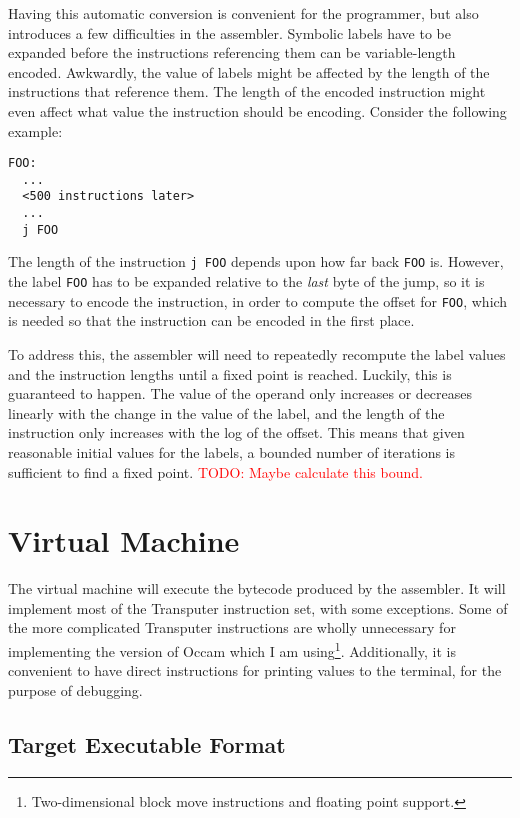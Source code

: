 Having this automatic conversion is convenient for the programmer, but also
introduces a few difficulties in the assembler. Symbolic labels have to be
expanded before the instructions referencing them can be variable-length
encoded. Awkwardly, the value of labels might be affected by the length of
the instructions that reference them. The length of the encoded instruction
might even affect what value the instruction should be encoding.
Consider the following example:

\begin{lstlisting}
FOO:
  ...
  <500 instructions later>
  ...
  j FOO
\end{lstlisting}

The length of the instruction \texttt{j FOO} depends upon how far back
\texttt{FOO} is. However, the label \texttt{FOO} has to be expanded relative to
the \textit{last} byte of the jump, so it is necessary to encode the
instruction, in order to compute the offset for \texttt{FOO}, which is needed so
that the instruction can be encoded in the first place.

To address this, the assembler will need to repeatedly recompute the label
values and the instruction lengths until a fixed point is reached. Luckily, this
is guaranteed to happen. The value of the operand only increases or decreases
linearly with the change in the value of the label, and the length of the
instruction only increases with the log of the offset. This means that given
reasonable initial values for the labels, a bounded number of iterations is
sufficient to find a fixed point. \textcolor{red}{TODO: Maybe calculate this
bound.}

\section{Virtual Machine}

The virtual machine will execute the bytecode produced by the assembler. It will
implement most of the Transputer instruction set, with some exceptions. Some of
the more complicated Transputer instructions are wholly unnecessary for
implementing the version of Occam which I am using\footnote{Two-dimensional
block move instructions and floating point support.}. Additionally, it is
convenient to have direct instructions for printing values to the terminal, for
the purpose of debugging.

\subsection{Target Executable Format} \label{binary-format}

